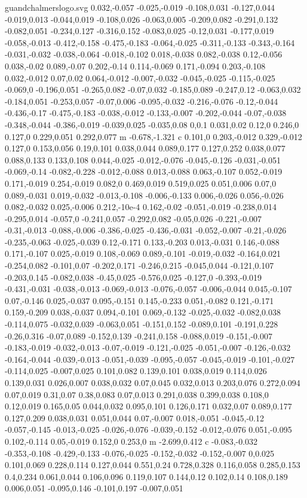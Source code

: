 \begin{filecontents}[noheader]{guandchalmerslogo.svg}
0.032,-0.057 -0.025,-0.019 -0.108,0.031 -0.127,0.044 -0.019,0.013 -0.044,0.019 -0.108,0.026 -0.063,0.005 -0.209,0.082 -0.291,0.132 -0.082,0.051 -0.234,0.127 -0.316,0.152 -0.083,0.025 -0.12,0.031 -0.177,0.019 -0.058,-0.013 -0.412,-0.158 -0.475,-0.183 -0.064,-0.025 -0.311,-0.133 -0.343,-0.164 -0.031,-0.032 -0.038,-0.064 -0.018,-0.102 0.018,-0.038 0.082,-0.038 0.12,-0.056 0.038,-0.02 0.089,-0.07 0.202,-0.14 0.114,-0.069 0.171,-0.094 0.203,-0.108 0.032,-0.012 0.07,0.02 0.064,-0.012 -0.007,-0.032 -0.045,-0.025 -0.115,-0.025 -0.069,0 -0.196,0.051 -0.265,0.082 -0.07,0.032 -0.185,0.089 -0.247,0.12 -0.063,0.032 -0.184,0.051 -0.253,0.057 -0.07,0.006 -0.095,-0.032 -0.216,-0.076 -0.12,-0.044 -0.436,-0.17 -0.475,-0.183 -0.038,-0.012 -0.133,-0.007 -0.202,-0.044 -0.07,-0.038 -0.348,-0.044 -0.386,-0.019 -0.039,0.025 -0.035,0.08 0,0.1 0.031,0.02 0.12,0 0.246,0 0.127,0 0.229,0.051 0.292,0.077 m -0.678,-1.321 c 0.101,0 0.203,-0.012 0.329,-0.012 0.127,0 0.153,0.056 0.19,0.101 0.038,0.044 0.089,0.177 0.127,0.252 0.038,0.077 0.088,0.133 0.133,0.108 0.044,-0.025 -0.012,-0.076 -0.045,-0.126 -0.031,-0.051 -0.069,-0.14 -0.082,-0.228 -0.012,-0.088 0.013,-0.088 0.063,-0.107 0.052,-0.019 0.171,-0.019 0.254,-0.019 0.082,0 0.469,0.019 0.519,0.025 0.051,0.006 0.07,0 0.089,-0.031 0.019,-0.032 -0.013,-0.108 -0.006,-0.133 0.006,-0.026 0.056,-0.026 0.082,-0.032 0.025,-0.006 0.212,-10e-4 0.162,-0.02 -0.051,-0.019 -0.238,0.014 -0.295,0.014 -0.057,0 -0.241,0.057 -0.292,0.082 -0.05,0.026 -0.221,-0.007 -0.31,-0.013 -0.088,-0.006 -0.386,-0.025 -0.436,-0.031 -0.052,-0.007 -0.21,-0.026 -0.235,-0.063 -0.025,-0.039 0.12,-0.171 0.133,-0.203 0.013,-0.031 0.146,-0.088 0.171,-0.107 0.025,-0.019 0.108,-0.069 0.089,-0.101 -0.019,-0.032 -0.164,0.021 -0.254,0.082 -0.101,0.07 -0.202,0.171 -0.246,0.215 -0.045,0.044 -0.121,0.107 -0.203,0.145 -0.082,0.038 -0.45,0.025 -0.576,0.025 -0.127,0 -0.393,-0.019 -0.431,-0.031 -0.038,-0.013 -0.069,-0.013 -0.076,-0.057 -0.006,-0.044 0.045,-0.107 0.07,-0.146 0.025,-0.037 0.095,-0.151 0.145,-0.233 0.051,-0.082 0.121,-0.171 0.159,-0.209 0.038,-0.037 0.094,-0.101 0.069,-0.132 -0.025,-0.032 -0.082,0.038 -0.114,0.075 -0.032,0.039 -0.063,0.051 -0.151,0.152 -0.089,0.101 -0.191,0.228 -0.26,0.316 -0.07,0.089 -0.152,0.139 -0.241,0.158 -0.088,0.019 -0.151,-0.007 -0.183,-0.019 -0.032,-0.013 -0.07,-0.019 -0.121,-0.025 -0.051,-0.007 -0.126,-0.032 -0.164,-0.044 -0.039,-0.013 -0.051,-0.039 -0.095,-0.057 -0.045,-0.019 -0.101,-0.027 -0.114,0.025 -0.007,0.025 0.101,0.082 0.139,0.101 0.038,0.019 0.114,0.026 0.139,0.031 0.026,0.007 0.038,0.032 0.07,0.045 0.032,0.013 0.203,0.076 0.272,0.094 0.07,0.019 0.31,0.07 0.38,0.083 0.07,0.013 0.291,0.038 0.399,0.038 0.108,0 0.12,0.019 0.165,0.05 0.044,0.032 0.095,0.101 0.126,0.171 0.032,0.07 0.089,0.177 0.127,0.209 0.038,0.031 0.051,0.044 0.07,-0.007 0.018,-0.051 -0.045,-0.12 -0.057,-0.145 -0.013,-0.025 -0.026,-0.076 -0.039,-0.152 -0.012,-0.076 0.051,-0.095 0.102,-0.114 0.05,-0.019 0.152,0 0.253,0 m -2.699,0.412 c -0.083,-0.032 -0.353,-0.108 -0.429,-0.133 -0.076,-0.025 -0.152,-0.032 -0.152,-0.007 0,0.025 0.101,0.069 0.228,0.114 0.127,0.044 0.551,0.24 0.728,0.328 0.116,0.058 0.285,0.153 0.4,0.234 0.061,0.044 0.106,0.096 0.119,0.107 0.144,0.12 0.102,0.14 0.108,0.189 0.006,0.051 -0.095,0.146 -0.101,0.197 -0.007,0.051 
\end{filecontents}
